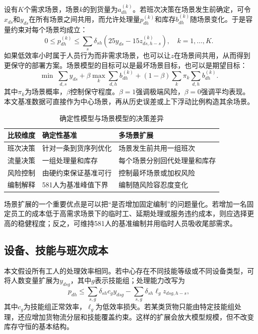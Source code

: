 设有$K$个需求场景，场景$k$的到货量为$a_{dh}^{(k)}$。若班次决策在场景发生前确定，可令$x_{ds}$和$y_{ds}$在所有场景之间共用，而允许处理量$p_{dh}^{(k)}$和库存$b_{dh}^{(k)}$随场景变化。于是容量约束对每个场景均成立：
\begin{equation}
 0\le p_{dh}^{(k)}
 \le \sum_s\delta_{sh}
 (25y_{ds}-15z_{ds,h-s}^{(k)}),
\quad k=1,\ldots,K.
\end{equation}
如果低效率小时属于人员行为而非需求场景，也可以让$z$在场景间共用，从而得到更保守的部署方案。场景模型的目标可以是最坏场景目标，也可以是期望目标：
 \begin{equation}
 \min \; \sum_{d,s}y_{ds}
 +\beta\max_k\sum_{d,h}b_{dh}^{(k)}
 +\left(1-\beta\right)\sum_k\pi_k
 \sum_{d,h}b_{dh}^{(k)}.
\end{equation}
其中$\pi_k$为场景概率，$\beta$控制保守程度。$\beta=1$强调极端风险，$\beta=0$强调平均表现。本文基准数据可直接作为中心场景，再从历史误差或上下浮动比例构造其余场景。

\begin{table}[htbp]
\centering
\caption{确定性模型与场景模型的决策差异}
\label{tab:robust-compare}
\begin{tabular}{p{}p{}p{}}
\toprule
比较维度 & 确定性基准 & 多场景扩展\\
\midrule
班次决策 & 针对一条到货序列优化 & 场景发生前共用一组班次\\
流量决策 & 一组处理量和库存 & 每个场景分别回代处理量和库存\\
风险控制 & 由硬约束保证基准可行 & 控制最坏场景或加权风险\\
编制解释 & 581人为基准峰值下界 & 编制随风险容忍度变化\\
\bottomrule
\end{tabular}
\end{table}

场景扩展的一个重要优点是可以把“是否增加固定编制”的问题量化。若增加一名固定员工的成本低于高需求场景下的临时工、延期处理或服务违约成本，则应选择更高的稳健程度；反之，可维持581人的基准编制并用临时人员吸收尾部需求。

\subsection{设备、技能与班次成本}

本文假设所有工人的处理效率相同。若中心存在不同技能等级或不同设备类型，可将人数变量扩展为$y_{dsg}$，其中$g$表示技能组；处理能力改写为
\begin{equation}
 p_{dh}\le\sum_{s,g}\delta_{sh}c_g y_{dsg}
 -\sum_{s,g}\delta_{sh}\ell_g z_{dsg,h-s},
\end{equation}
其中$c_g$为技能组正常效率，$\ell_g$为低效率损失。若某类货物只能由特定技能组处理，还应增加货物流分层和技能覆盖约束。这样的扩展会放大模型规模，但不改变库存守恒的基本结构。

